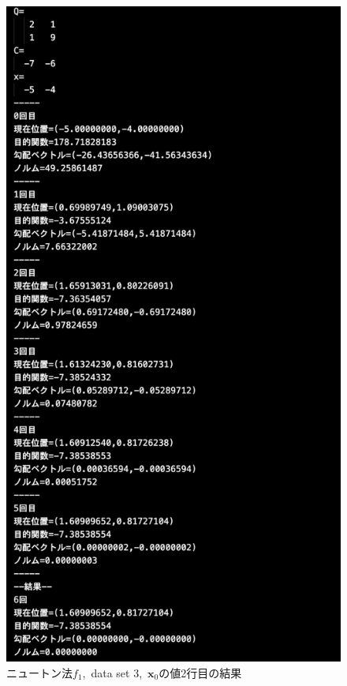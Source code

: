 \documentclass[12pt]{jarticle}
\begin{document}
\clearpage
\begin{figure}[h]
    \begin{center}
        \includegraphics[scale=0.15]{kadai1_1n_out3_2_1.png}
    \end{center}
    \caption{ニュートン法$f_1$,\ data set 3,\ $\boldsymbol{x}_0$の値2行目の結果}
\end{figure}
\end{document}
